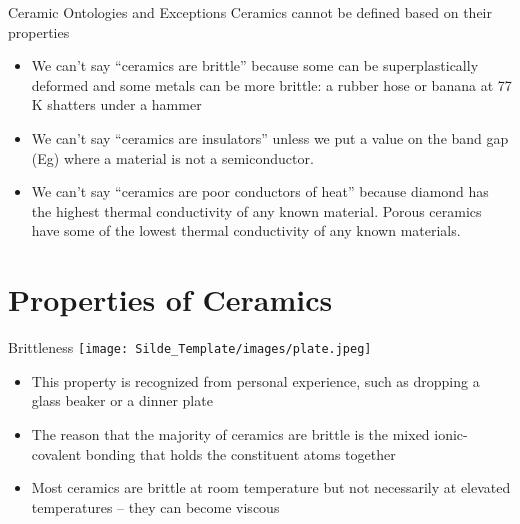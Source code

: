 \documentclass{libs/XJTLU_format}
\begin{document}
\begin{frame}{Ceramic Ontologies and Exceptions}
Ceramics cannot be defined based on their properties

\begin{itemize}
    \item We can’t say “ceramics are brittle” because some can be superplastically deformed and some metals can be more brittle: a rubber hose or banana at 77 K shatters under a hammer
    \pause
    \item We can’t say “ceramics are insulators” unless we put a value on the band gap (Eg) where a material is not a semiconductor.
    \pause
    \item We can’t say “ceramics are poor conductors of heat” because diamond has the highest thermal conductivity of any known material. Porous ceramics have some of the lowest thermal conductivity of any known materials.
\end{itemize}
    
\end{frame}

\section{Properties of Ceramics}

\begin{frame}{Brittleness}
    \centering
    \texttt{[image: Silde\_Template/images/plate.jpeg]}
    
    \begin{itemize}
        \item This property is recognized from personal experience, such as dropping a glass beaker or a dinner plate
        \pause
        \item The reason that the majority of ceramics are brittle is the mixed ionic-covalent bonding that holds the constituent atoms together
        \pause
        \item Most ceramics are brittle at room temperature but not necessarily at elevated temperatures -- they can become viscous
    \end{itemize}
    
\end{frame}
\end{document}
